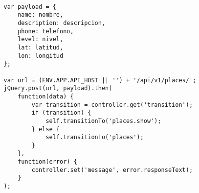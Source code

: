 \begin{center}
 \begin{lstlisting}[label=new_place_request,caption=POST request creado en el controlador de \emph{ember}]

   var payload = {
       name: nombre,
       description: descripcion,
       phone: telefono,
       level: nivel,
       lat: latitud,
       lon: longitud
   };

   var url = (ENV.APP.API_HOST || '') + '/api/v1/places/';
   jQuery.post(url, payload).then(
       function(data) {
           var transition = controller.get('transition');
           if (transition) {
               self.transitionTo('places.show');
           } else {
               self.transitionTo('places');
           }
       },
       function(error) {
           controller.set('message', error.responseText);
       }
   );

 \end{lstlisting}
\end{center}







